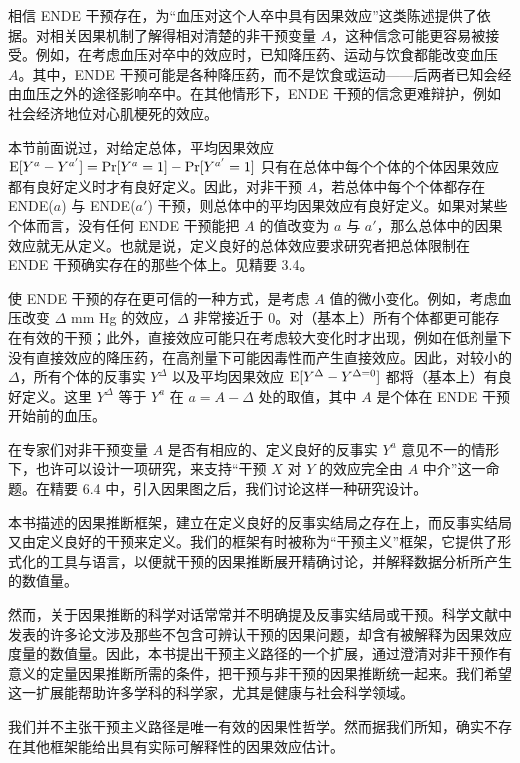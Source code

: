 
相信 ENDE 干预存在，为“血压对这个人卒中具有因果效应”这类陈述提供了依据。对相关因果机制了解得相对清楚的非干预变量 $A$，这种信念可能更容易被接受。例如，在考虑血压对卒中的效应时，已知降压药、运动与饮食都能改变血压 $A$。其中，ENDE 干预可能是各种降压药，而不是饮食或运动——后两者已知会经由血压之外的途径影响卒中。在其他情形下，ENDE 干预的信念更难辩护，例如社会经济地位对心肌梗死的效应。

本节前面说过，对给定总体，平均因果效应 $\mathrm{E}[Y^{a}-Y^{a'}]=\Pr[Y^{a}=1]-\Pr[Y^{a'}=1]$ 只有在总体中每个个体的个体因果效应都有良好定义时才有良好定义。因此，对非干预 $A$，若总体中每个个体都存在 ENDE($a$) 与 ENDE($a'$) 干预，则总体中的平均因果效应有良好定义。如果对某些个体而言，没有任何 ENDE 干预能把 $A$ 的值改变为 $a$ 与 $a'$，那么总体中的因果效应就无从定义。也就是说，定义良好的总体效应要求研究者把总体限制在 ENDE 干预确实存在的那些个体上。见精要 3.4。


使 ENDE 干预的存在更可信的一种方式，是考虑 $A$ 值的微小变化。例如，考虑血压改变 $\Delta$ mm Hg 的效应，$\Delta$ 非常接近于 0。对（基本上）所有个体都更可能存在有效的干预；此外，直接效应可能只在考虑较大变化时才出现，例如在低剂量下没有直接效应的降压药，在高剂量下可能因毒性而产生直接效应。因此，对较小的 $\Delta$，所有个体的反事实 $Y^{\Delta}$ 以及平均因果效应 $\mathrm{E}[Y^{\Delta}-Y^{\Delta=0}]$ 都将（基本上）有良好定义。这里 $Y^{\Delta}$ 等于 $Y^{a}$ 在 $a=A-\Delta$ 处的取值，其中 $A$ 是个体在 ENDE 干预开始前的血压。

在专家们对非干预变量 $A$ 是否有相应的、定义良好的反事实 $Y^{a}$ 意见不一的情形下，也许可以设计一项研究，来支持“干预 $X$ 对 $Y$ 的效应完全由 $A$ 中介”这一命题。在精要 6.4 中，引入因果图之后，我们讨论这样一种研究设计。

\renewcommand{\FPname}{精要（Fine Point）}
\begin{finepoint}[干预主义路径的因果推断]
本书描述的因果推断框架，建立在定义良好的反事实结局之存在上，而反事实结局又由定义良好的干预来定义。我们的框架有时被称为“干预主义”框架，它提供了形式化的工具与语言，以便就干预的因果推断展开精确讨论，并解释数据分析所产生的数值量。

然而，关于因果推断的科学对话常常并不明确提及反事实结局或干预。科学文献中发表的许多论文涉及那些不包含可辨认干预的因果问题，却含有被解释为因果效应度量的数值量。因此，本书提出干预主义路径的一个扩展，通过澄清对非干预作有意义的定量因果推断所需的条件，把干预与非干预的因果推断统一起来。我们希望这一扩展能帮助许多学科的科学家，尤其是健康与社会科学领域。

我们并不主张干预主义路径是唯一有效的因果性哲学。然而据我们所知，确实不存在其他框架能给出具有实际可解释性的因果效应估计。
\end{finepoint}
\renewcommand{\FPname}{精要}

